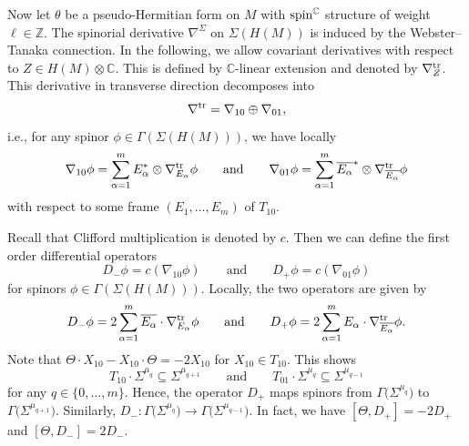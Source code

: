 \documentclass[10pt,a4paper]{amsart}
\numberwithin{equation}{section}
\newcommand{\ZZ}{\mathbb{Z}}
\newcommand{\CC}{\mathbb{C}}
\begin{document}
Now let $\theta$ be a pseudo-Hermitian form on $M$ with ${\rm spin}^\CC$ structure of weight $\ell\in\ZZ$.
The spinorial derivative $\nabla^\Sigma$ on $\Sigma(H(M))$ is induced by the Webster--Tanaka connection.
In the following, we allow covariant derivatives with respect to $Z\in H(M)\otimes\CC$.
This is defined by $\CC$-linear extension and denoted by $\nabla^{\rm tr}_Z$.
This derivative in transverse direction decomposes into
\[
\nabla^{\rm tr} = \nabla_{10} \oplus \nabla_{01},
\]
i.e., for any spinor $\phi\in\Gamma(\Sigma(H(M)))$, we have locally
\[
\nabla_{10}\phi = \sum_{\alpha=1}^m E_\alpha^*\otimes \nabla^{\rm tr}_{E_\alpha}\phi\qquad\mbox{and}\qquad
\nabla_{01}\phi = \sum_{\alpha=1}^m \overline{E_\alpha}^*\otimes \nabla^{\rm tr}_{\overline{E_\alpha}}\phi
\]
with respect to some frame $(E_1,\dots,E_m)$ of $T_{10}$.

Recall that Clifford multiplication is denoted by $c$. Then we can define the first order differential operators
\[
D_-\phi = c(\nabla_{10}\phi)\qquad \mbox{and}\qquad D_+\phi = c(\nabla_{01}\phi)
\]
for spinors $\phi\in\Gamma(\Sigma(H(M)))$. Locally, the two operators are given by
\[
D_-\phi = 2\sum_{\alpha=1}^m \overline{E_\alpha}\cdot\nabla^{\rm tr}_{E_\alpha}\phi\qquad\mbox{and}\qquad
D_+\phi = 2\sum_{\alpha=1}^m E_\alpha\cdot \nabla^{\rm tr}_{\overline{E_\alpha}}\phi.
\]
Note that $\Theta\cdot X_{10}- X_{10}\cdot \Theta = -2X_{10}$ for $X_{10}\in T_{10}$. This shows
\[ T_{10}\cdot \Sigma^{\mu_q} \subseteq \Sigma^{\mu_{q+1}}\qquad\mbox{and}\qquad T_{01}\cdot \Sigma^{\mu_q} \subseteq \Sigma^{\mu_{q-1}}\]
for any $q\in\{0,\dots,m\}$. Hence, the operator $D_+$ maps spinors from $\Gamma\big(\Sigma^{\mu_{q}}\big)$ to $\Gamma\big(\Sigma^{\mu_{q+1}}\big)$.
Similarly, $D_-\colon \Gamma\big(\Sigma^{\mu_{q}}\big)\to\Gamma\big(\Sigma^{\mu_{q-1}}\big)$.
In fact, we have $[\Theta,D_+]=-2D_+$ and $[\Theta,D_-]= 2D_-$.
\end{document}
